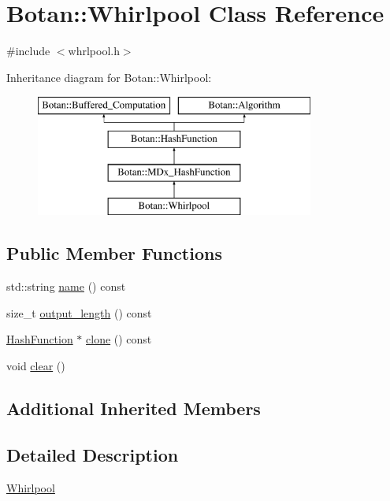 \hypertarget{classBotan_1_1Whirlpool}{\section{Botan\-:\-:Whirlpool Class Reference}
\label{classBotan_1_1Whirlpool}
}


{\ttfamily \#include $<$whrlpool.\-h$>$}

Inheritance diagram for Botan\-:\-:Whirlpool\-:\begin{figure}[H]
\begin{center}
\leavevmode
\includegraphics[height=4.000000cm]{classBotan_1_1Whirlpool}
\end{center}
\end{figure}
\subsection*{Public Member Functions}
\begin{DoxyCompactItemize}
\item 
std\-::string \hyperlink{classBotan_1_1Whirlpool_a5a6cac2323d4762f328fb697429d459e}{name} () const 
\item 
size\-\_\-t \hyperlink{classBotan_1_1Whirlpool_af2d75880e72ad1f8f9e70e815df44c77}{output\-\_\-length} () const 
\item 
\hyperlink{classBotan_1_1HashFunction}{Hash\-Function} $\ast$ \hyperlink{classBotan_1_1Whirlpool_a95d7868fa7c55e1eb4a8cf19688ca806}{clone} () const 
\item 
void \hyperlink{classBotan_1_1Whirlpool_aba2adeeff55952cad4a6aefabb885f80}{clear} ()
\end{DoxyCompactItemize}
\subsection*{Additional Inherited Members}


\subsection{Detailed Description}
\hyperlink{classBotan_1_1Whirlpool}{Whirlpool} 

